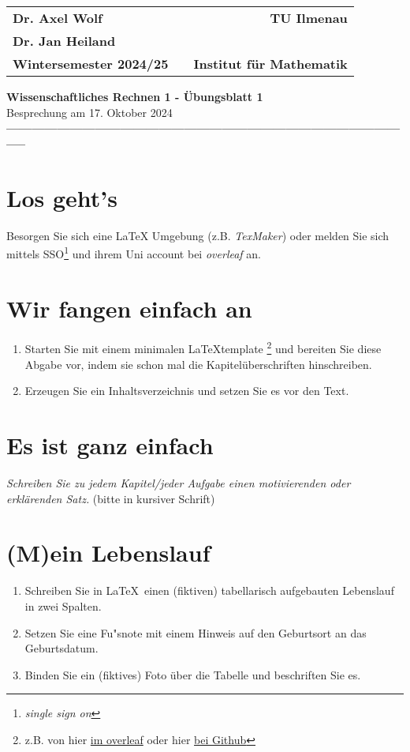 \documentclass[12pt]{scrartcl}
\begin{document}
\begin{tabular}{lp{3.3cm}r}
\textbf{Dr. Axel Wolf}&&\textbf{TU Ilmenau}\\ \textbf{Dr. Jan Heiland} &&\\
\textbf{Wintersemester 2024/25}&& \textbf{Institut f\"ur Mathematik}
\end{tabular}

\begin{center}
{\Large \textbf{ Wissenschaftliches Rechnen 1 - \"Ubungsblatt 1}}\\[1em]
{\large Besprechung am 17. Oktober 2024}
\\ \textbf{
--------------------------------------------------------------------------------------------------}
\end{center}

\tableofcontents

\section{Los geht's} Besorgen Sie sich eine \LaTeX{} Umgebung (z.B.
\emph{TexMaker})
oder melden Sie sich mittels SSO\footnote{\emph{single sign on}} und ihrem Uni
account bei \emph{overleaf} an.

\section{Wir fangen einfach an}
\begin{enumerate}
  \item Starten Sie mit einem minimalen \LaTeX template%
    \footnote{z.B. von hier
    \href{https://www.overleaf.com/read/bbdzfwnxkyyp\#1976b0}{im overleaf} oder
  hier \href{https://github.com/highlando/24-WiRe1-baserepo/blob/main/wire-1-template.tex}{bei
Github}
}
    und bereiten Sie diese
    Abgabe vor, indem sie schon mal die Kapitel\"uberschriften hinschreiben.
\item Erzeugen Sie ein Inhaltsverzeichnis und setzen Sie es vor den Text.
\end{enumerate}

\section{Es ist ganz einfach}
\textit{Schreiben Sie zu jedem \emph{Kapitel/jeder Aufgabe} einen motivierenden oder
erkl\"arenden Satz.} (bitte in kursiver Schrift)

\section{(M)ein Lebenslauf}  
\begin{enumerate}
\item 
Schreiben Sie in \LaTeX\ einen (fiktiven) tabellarisch aufgebauten Lebenslauf in zwei Spalten. 
\item
Setzen Sie eine Fu"snote mit einem Hinweis auf den Geburtsort an das Geburtsdatum.
\item
Binden Sie ein (fiktives) Foto über die Tabelle und beschriften Sie es.
\end{enumerate}
\end{document}
